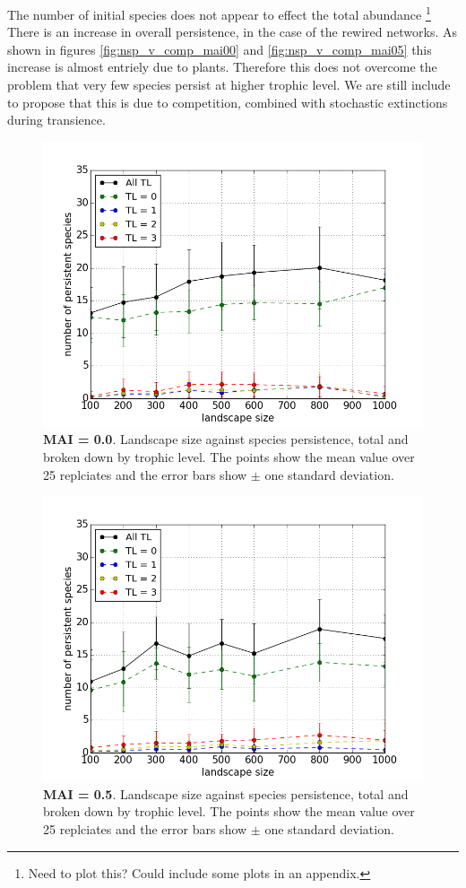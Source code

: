 The number of initial species does not appear to effect the total abundance \footnote{Need to plot this? Could include some plots in an appendix.} There is an increase in overall persistence, in the case of the rewired networks. As shown in figures \ref{fig:nsp_v_comp_mai00} and \ref{fig:nsp_v_comp_mai05} this increase is almost entriely due to plants. Therefore this does not overcome the problem that very few species persist at higher trophic level. We are still include to propose that this is due to competition, combined with stochastic extinctions during transience.


\begin{figure}
	\centering
	\includegraphics[width=0.8\linewidth]{"figures/ls_v_comp_mai00_standard"}
	\caption{\textbf{MAI = 0.0}. Landscape size against species persistence, total and broken down by trophic level. The points show the mean value over 25 replciates and the error bars show $\pm$ one standard deviation.}
	\label{fig:ls_v_comp_mai00}
\end{figure}
 
\begin{figure}
	\centering
	\includegraphics[width=0.8\linewidth]{"figures/ls_v_comp_mai05_standard"}
	\caption{\textbf{MAI = 0.5}. Landscape size against species persistence, total and broken down by trophic level. The points show the mean value over 25 replciates and the error bars show $\pm$ one standard deviation.}
	\label{fig:ls_v_comp_mai05}
\end{figure}


